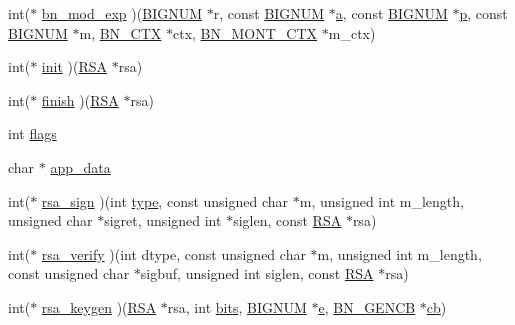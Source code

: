 \begin{DoxyCompactItemize}
\item 
int($\ast$ \hyperlink{structrsa__meth__st_a7a6152fcea56bc6f6e4c8134595bc5e4}{bn\+\_\+mod\+\_\+exp} )(\hyperlink{crypto_2ossl__typ_8h_a6fb19728907ec6515e4bfb716bffa141}{B\+I\+G\+N\+UM} $\ast$r, const \hyperlink{crypto_2ossl__typ_8h_a6fb19728907ec6515e4bfb716bffa141}{B\+I\+G\+N\+UM} $\ast$\hyperlink{hpux_8cc_af3e37283d97a42ffc096d8958a745f32}{a}, const \hyperlink{crypto_2ossl__typ_8h_a6fb19728907ec6515e4bfb716bffa141}{B\+I\+G\+N\+UM} $\ast$\hyperlink{ssl__locl_8h_a4014c6f4a6fa0e565ca592bcaca0fa58}{p}, const \hyperlink{crypto_2ossl__typ_8h_a6fb19728907ec6515e4bfb716bffa141}{B\+I\+G\+N\+UM} $\ast$m, \hyperlink{crypto_2ossl__typ_8h_a0b235a35b7dd7922c097571ecd90e2bc}{B\+N\+\_\+\+C\+TX} $\ast$ctx, \hyperlink{crypto_2ossl__typ_8h_aec902d353e00ced6d3fee6cd033a8bd0}{B\+N\+\_\+\+M\+O\+N\+T\+\_\+\+C\+TX} $\ast$m\+\_\+ctx)
\item 
int($\ast$ \hyperlink{structrsa__meth__st_a654dcfa150efa134b91bc4746288bc14}{init} )(\hyperlink{crypto_2ossl__typ_8h_a9ad4496a11f0a9f686bea793cb97f8b5}{R\+SA} $\ast$rsa)
\item 
int($\ast$ \hyperlink{structrsa__meth__st_a9cc8f4b4cacef59237fd998e65c0c4da}{finish} )(\hyperlink{crypto_2ossl__typ_8h_a9ad4496a11f0a9f686bea793cb97f8b5}{R\+SA} $\ast$rsa)
\item 
int \hyperlink{structrsa__meth__st_ac8bf36fe0577cba66bccda3a6f7e80a4}{flags}
\item 
char $\ast$ \hyperlink{structrsa__meth__st_adc165d2dbd917509babcf4bcce182a13}{app\+\_\+data}
\item 
int($\ast$ \hyperlink{structrsa__meth__st_aed7bc1da03d0351f8cfeb4f071d156bd}{rsa\+\_\+sign} )(int \hyperlink{include_2openssl_2x509_8h_ab512b8f495325c7ea0f5a5a5d3f938eb}{type}, const unsigned char $\ast$m, unsigned int m\+\_\+length, unsigned char $\ast$sigret, unsigned int $\ast$siglen, const \hyperlink{crypto_2ossl__typ_8h_a9ad4496a11f0a9f686bea793cb97f8b5}{R\+SA} $\ast$rsa)
\item 
int($\ast$ \hyperlink{structrsa__meth__st_aad7b0a7e64b34eb1fbc49d6149d1e1de}{rsa\+\_\+verify} )(int dtype, const unsigned char $\ast$m, unsigned int m\+\_\+length, const unsigned char $\ast$sigbuf, unsigned int siglen, const \hyperlink{crypto_2ossl__typ_8h_a9ad4496a11f0a9f686bea793cb97f8b5}{R\+SA} $\ast$rsa)
\item 
int($\ast$ \hyperlink{structrsa__meth__st_a8aed2bc7ebc70dd006a4657ac8075e27}{rsa\+\_\+keygen} )(\hyperlink{crypto_2ossl__typ_8h_a9ad4496a11f0a9f686bea793cb97f8b5}{R\+SA} $\ast$rsa, int \hyperlink{include_2openssl_2x509v3_8h_ab3c186980893d6836a68407d221ae9c9}{bits}, \hyperlink{crypto_2ossl__typ_8h_a6fb19728907ec6515e4bfb716bffa141}{B\+I\+G\+N\+UM} $\ast$\hyperlink{apps_8h_a58a5cbe6bfe72fab1de65113aef90aa0}{e}, \hyperlink{crypto_2ossl__typ_8h_ae122a8be18f4fe821e5389381ececa09}{B\+N\+\_\+\+G\+E\+N\+CB} $\ast$\hyperlink{include_2openssl_2pem_8h_a921d6e42da41258bdbb0d8184d7554a2}{cb})
\end{DoxyCompactItemize}


